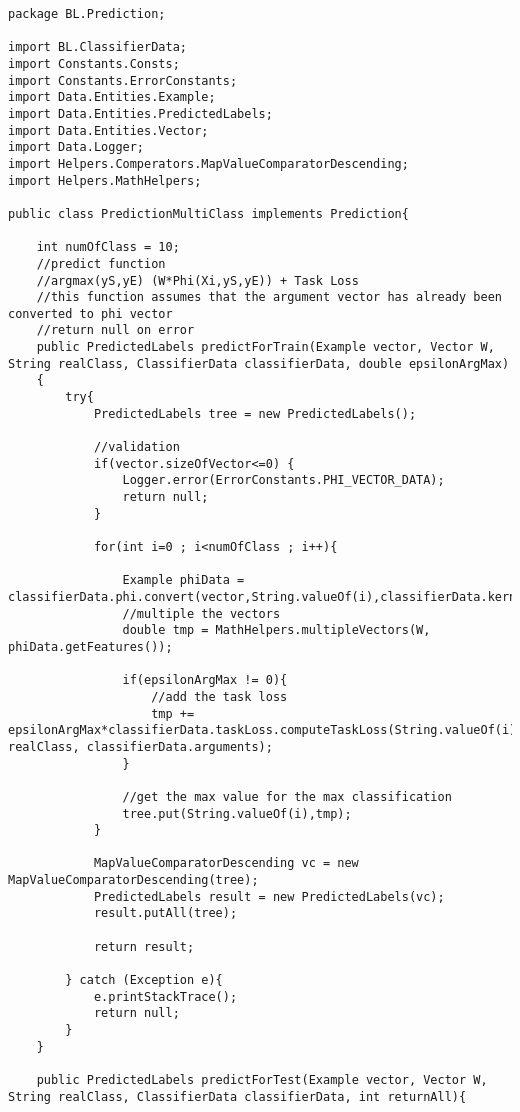 \documentclass[11pt, oneside]{article}   	%
\begin{document}
\begin{lstlisting}
package BL.Prediction;

import BL.ClassifierData;
import Constants.Consts;
import Constants.ErrorConstants;
import Data.Entities.Example;
import Data.Entities.PredictedLabels;
import Data.Entities.Vector;
import Data.Logger;
import Helpers.Comperators.MapValueComparatorDescending;
import Helpers.MathHelpers;

public class PredictionMultiClass implements Prediction{

    int numOfClass = 10;
    //predict function
    //argmax(yS,yE) (W*Phi(Xi,yS,yE)) + Task Loss
    //this function assumes that the argument vector has already been converted to phi vector
    //return null on error
    public PredictedLabels predictForTrain(Example vector, Vector W, String realClass, ClassifierData classifierData, double epsilonArgMax)
    {
        try{
            PredictedLabels tree = new PredictedLabels();

            //validation
            if(vector.sizeOfVector<=0) {
                Logger.error(ErrorConstants.PHI_VECTOR_DATA);
                return null;
            }

            for(int i=0 ; i<numOfClass ; i++){

                Example phiData = classifierData.phi.convert(vector,String.valueOf(i),classifierData.kernel);
                //multiple the vectors
                double tmp = MathHelpers.multipleVectors(W, phiData.getFeatures());

                if(epsilonArgMax != 0){
                    //add the task loss
                    tmp += epsilonArgMax*classifierData.taskLoss.computeTaskLoss(String.valueOf(i), realClass, classifierData.arguments);
                }

                //get the max value for the max classification
                tree.put(String.valueOf(i),tmp);
            }

            MapValueComparatorDescending vc = new MapValueComparatorDescending(tree);
            PredictedLabels result = new PredictedLabels(vc);
            result.putAll(tree);

            return result;

        } catch (Exception e){
            e.printStackTrace();
            return null;
        }
    }

    public PredictedLabels predictForTest(Example vector, Vector W, String realClass, ClassifierData classifierData, int returnAll){


\end{lstlisting}
\end{document}
